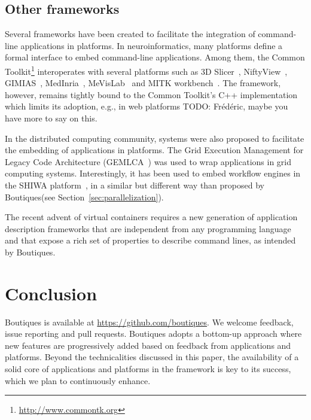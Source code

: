 \documentclass{article}
\newcommand{\todo}[1]{\color{red}TODO: #1\color{black}}
\newcommand{\boutiques}{Boutiques\xspace}
\begin{document}
\subsection{Other frameworks}

Several frameworks have been created to facilitate the
integration of command-line applications in platforms. In
neuroinformatics, many platforms define a formal interface to embed
command-line applications. Among them, the Common
Toolkit\footnote{\url{http://www.commontk.org}} interoperates with
several platforms such as 3D Slicer~\cite{pieper20043d},
NiftyView~\cite{Craddock2016}, GIMIAS~\cite{larrabide2009gimias},
MedInria~\cite{larrabide2009gimias}, MeVisLab~\cite{heckel2009object}
and MITK workbench~\cite{nolden2013medical}. The framework, however,
remains tightly bound to the Common Toolkit's C++ implementation which
limits its adoption, e.g., in web platforms \todo{Fr\'ed\'eric, maybe
  you have more to say on this}.

In the distributed computing community, systems were also proposed to
facilitate the embedding of applications in platforms. The Grid
Execution Management for Legacy Code Architecture
(GEMLCA~\cite{delaitre2005gemlca}) was used to wrap applications in
grid computing systems. Interestingly, it has been used to embed
workflow engines in the SHIWA
platform~\cite{terstyanszky2014enabling}, in a similar but different
way than proposed by \boutiques (see Section~\ref{sec:parallelization}).

The recent advent of virtual containers requires a new generation of
application description frameworks that are independent from any
programming language and that expose a rich set of properties to
describe command lines, as intended by \boutiques.

\section{Conclusion}

\boutiques is available at \url{https://github.com/boutiques}. We
welcome feedback, issue reporting and pull requests. \boutiques adopts
a bottom-up approach where new features are progressively added based
on feedback from applications and platforms. Beyond the technicalities
discussed in this paper, the availability of a solid core of
applications and platforms in the framework is key to its success,
which we plan to continuously enhance.



\end{document}

